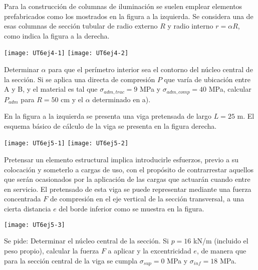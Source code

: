 Para la construcción de columnas de iluminación se suelen emplear elementos prefabricados como los mostrados en la figura a la izquierda. Se considera una de esas columnas de sección tubular de radio externo $R$ y radio interno $r= \alpha R$, como indica la figura a la derecha.

\begin{center}
		\texttt{[image: UT6ej4-1]}
	\hspace{0.1\textwidth}
		\texttt{[image: UT6ej4-2]}
\end{center}


\parte Determinar $\alpha$ para que el perímetro interior sea el contorno del núcleo central de la sección.
\parte Si se aplica una directa de compresión $P$ que varía de ubicación entre A y B, y el material es tal que $\sigma_{adm,trac}=9$ MPa y $\sigma_{adm,comp}=40$ MPa, calcular $P_{adm}$ para $R=50$ cm y el $\alpha$ determinado en a).

\ejercicio 

En la figura a la izquierda se presenta una viga pretensada de largo $L=25 $ m. El esquema básico de cálculo de la viga se presenta en la figura derecha.

\begin{center}
	\texttt{[image: UT6ej5-1]}
	\hspace{0.1\textwidth}
	\texttt{[image: UT6ej5-2]}
\end{center}

Pretensar un elemento estructural implica introducirle esfuerzos, previo a su colocación y someterlo a cargas de uso, con el propósito de contrarrestar aquellos que serán ocasionados por la aplicación de las cargas que actuarán cuando entre en servicio. El pretensado de esta viga se puede representar mediante una fuerza concentrada $F$ de compresión en el eje vertical de la sección transversal, a una cierta distancia $e$ del borde inferior como se muestra en la figura.

\begin{center}
	\texttt{[image: UT6ej5-3]}
\end{center}

Se pide:
\parte Determinar el núcleo central de la sección.
\parte Si $p=16 $ kN/m (incluido el peso propio), calcular la fuerza $F$ a aplicar y la excentricidad $e$, de manera que para la sección central de la viga se cumpla $\sigma_{sup}=0$ MPa y $\sigma_{inf}=18$ MPa.

